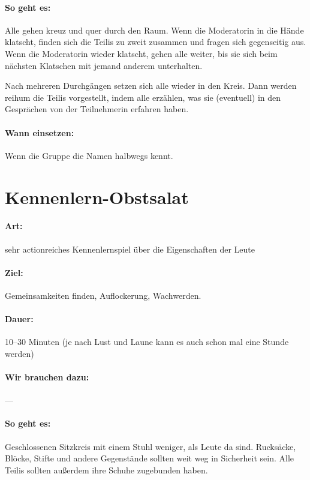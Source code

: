 \paragraph{So geht es:}
Alle gehen kreuz und quer durch den Raum. Wenn die Moderatorin in die Hände klatscht, finden sich die Teilis zu zweit zusammen und fragen sich gegenseitig aus. Wenn die Moderatorin wieder klatscht, gehen alle weiter, bis sie sich beim nächsten Klatschen mit jemand anderem unterhalten.

Nach mehreren Durchgängen setzen sich alle wieder in den Kreis. Dann werden reihum die Teilis vorgestellt, indem alle erzählen, was sie (eventuell) in den Gesprächen von der Teilnehmerin erfahren haben.
\paragraph{Wann einsetzen:} Wenn die Gruppe die Namen halbwegs kennt.

\section{Kennenlern-Obstsalat}
\paragraph{Art:} sehr actionreiches Kennenlernspiel über die Eigenschaften der Leute
\paragraph{Ziel:} Gemeinsamkeiten finden, Auflockerung, Wachwerden.
\paragraph{Dauer:} 10--30 Minuten (je nach Lust und Laune kann es auch schon mal eine Stunde werden)
\paragraph{Wir brauchen dazu:} ---
\paragraph{So geht es:} Geschlossenen Sitzkreis mit einem Stuhl weniger, als Leute da sind. Rucksäcke, Blöcke, Stifte und andere Gegenstände sollten weit weg in Sicherheit sein. Alle Teilis sollten außerdem ihre Schuhe zugebunden haben.

